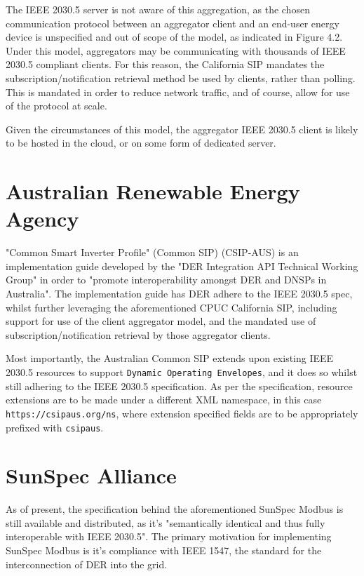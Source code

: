 The IEEE 2030.5 server is not aware of this aggregation, as the chosen communication protocol between an aggregator client and an end-user energy device is unspecified and out of scope of the model, as indicated in Figure 4.2.
Under this model, aggregators may be communicating with thousands of IEEE 2030.5 compliant clients. For this reason, the California SIP mandates the subscription/notification retrieval method be used by clients, rather than polling.
This is mandated in order to reduce network traffic, and of course, allow for use of the protocol at scale.

Given the circumstances of this model, the aggregator IEEE 2030.5 client is likely to be hosted in the cloud, or on some form of dedicated server.


\section{Australian Renewable Energy Agency}
"Common Smart Inverter Profile" (Common SIP) (CSIP-AUS) is an implementation guide developed by the "DER Integration API Technical Working Group" in order to "promote interoperability amongst DER and DNSPs in Australia".
The implementation guide has DER adhere to the IEEE 2030.5 spec, whilst further leveraging the aforementioned CPUC California SIP, including support for use of the client aggregator model, and the mandated use of subscription/notification retrieval by those aggregator clients. \cite[]{CSIPAus}

Most importantly, the Australian Common SIP extends upon existing IEEE 2030.5 resources to support \texttt{Dynamic Operating Envelopes}, and it does so whilst still adhering to the IEEE 2030.5 specification.
As per the specification, resource extensions are to be made under a different XML namespace, in this case \texttt{https://csipaus.org/ns}, where extension specified fields are to be appropriately prefixed with \texttt{csipaus}. \cite[]{CSIPAus}

\section{SunSpec Alliance}

As of present, the specification behind the aforementioned SunSpec Modbus is still available and distributed, as it's "semantically identical and thus fully interoperable with IEEE 2030.5". 
The primary motivation for implementing SunSpec Modbus is it's compliance with IEEE 1547, the standard for the interconnection of DER into the grid. \cite[]{SunSpecModbus}

